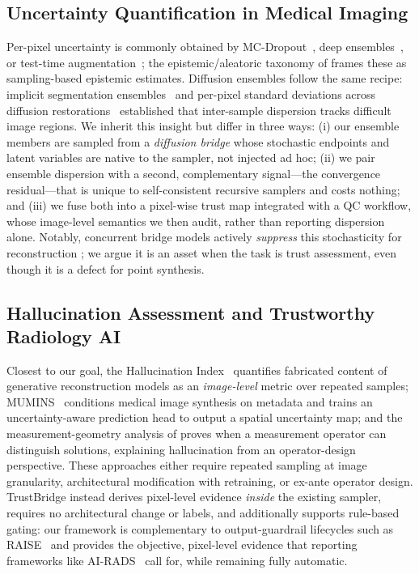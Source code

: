 \subsection{Uncertainty Quantification in Medical Imaging}
Per-pixel uncertainty is commonly obtained by MC-Dropout~\cite{gal2016mcdropout},
deep ensembles~\cite{lakshminarayanan2017ensembles}, or test-time
augmentation~\cite{ayhan2018tta}; the epistemic/aleatoric taxonomy of
\cite{kendall2017uncertainties} frames these as sampling-based epistemic
estimates. Diffusion ensembles follow the same recipe: implicit segmentation
ensembles~\cite{wolleb2022diffusionensembles} and per-pixel standard deviations
across diffusion restorations~\cite{osuna2024microscopy} established that
inter-sample dispersion tracks difficult image regions. We inherit this insight
but differ in three ways: (i) our ensemble members are sampled from a
\emph{diffusion bridge} whose stochastic endpoints and latent variables are
native to the sampler, not injected ad hoc; (ii) we pair ensemble dispersion
with a second, complementary signal---the convergence residual---that
is unique to self-consistent recursive samplers and costs nothing; and (iii) we
fuse both into a pixel-wise trust map integrated with a QC workflow,
whose image-level semantics we then audit, rather than reporting dispersion
alone. Notably, concurrent bridge models actively
\emph{suppress} this stochasticity for reconstruction
\cite{song2024ccbm}; we argue it is an asset when the task is trust assessment,
even though it is a defect for point synthesis.

\subsection{Hallucination Assessment and Trustworthy Radiology AI}
Closest to our goal, the Hallucination Index~\cite{tivnan2024hallucinationindex}
quantifies fabricated content of generative reconstruction models as an
\emph{image-level} metric over repeated samples; MUMINS~\cite{oliveras2026mumins}
conditions medical image synthesis on metadata and trains an uncertainty-aware
prediction head to output a spatial uncertainty map; and the measurement-geometry
analysis of \cite{jin2026trustworthy} proves when a measurement operator can
distinguish solutions, explaining hallucination from an operator-design
perspective. These approaches either require repeated sampling at image
granularity, architectural modification with retraining, or ex-ante operator
design. TrustBridge instead derives pixel-level evidence \emph{inside} the
existing sampler, requires no architectural change or labels, and additionally
supports rule-based gating: our framework is complementary to output-guardrail
lifecycles such as RAISE~\cite{cardoso2023raise} and provides the objective,
pixel-level evidence that reporting frameworks like
AI-RADS~\cite{russe2026airads} call for, while remaining fully automatic.

